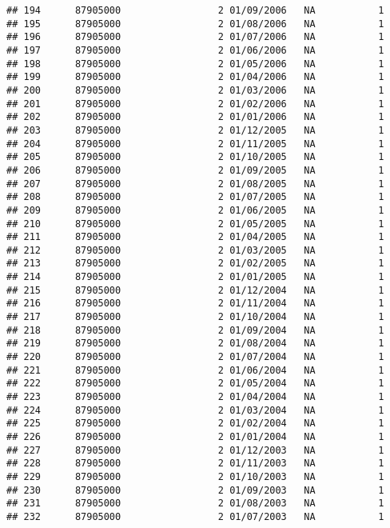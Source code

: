 \documentclass[
]{article}
\begin{document}
\begin{verbatim}
## 194      87905000                 2 01/09/2006   NA           1
## 195      87905000                 2 01/08/2006   NA           1
## 196      87905000                 2 01/07/2006   NA           1
## 197      87905000                 2 01/06/2006   NA           1
## 198      87905000                 2 01/05/2006   NA           1
## 199      87905000                 2 01/04/2006   NA           1
## 200      87905000                 2 01/03/2006   NA           1
## 201      87905000                 2 01/02/2006   NA           1
## 202      87905000                 2 01/01/2006   NA           1
## 203      87905000                 2 01/12/2005   NA           1
## 204      87905000                 2 01/11/2005   NA           1
## 205      87905000                 2 01/10/2005   NA           1
## 206      87905000                 2 01/09/2005   NA           1
## 207      87905000                 2 01/08/2005   NA           1
## 208      87905000                 2 01/07/2005   NA           1
## 209      87905000                 2 01/06/2005   NA           1
## 210      87905000                 2 01/05/2005   NA           1
## 211      87905000                 2 01/04/2005   NA           1
## 212      87905000                 2 01/03/2005   NA           1
## 213      87905000                 2 01/02/2005   NA           1
## 214      87905000                 2 01/01/2005   NA           1
## 215      87905000                 2 01/12/2004   NA           1
## 216      87905000                 2 01/11/2004   NA           1
## 217      87905000                 2 01/10/2004   NA           1
## 218      87905000                 2 01/09/2004   NA           1
## 219      87905000                 2 01/08/2004   NA           1
## 220      87905000                 2 01/07/2004   NA           1
## 221      87905000                 2 01/06/2004   NA           1
## 222      87905000                 2 01/05/2004   NA           1
## 223      87905000                 2 01/04/2004   NA           1
## 224      87905000                 2 01/03/2004   NA           1
## 225      87905000                 2 01/02/2004   NA           1
## 226      87905000                 2 01/01/2004   NA           1
## 227      87905000                 2 01/12/2003   NA           1
## 228      87905000                 2 01/11/2003   NA           1
## 229      87905000                 2 01/10/2003   NA           1
## 230      87905000                 2 01/09/2003   NA           1
## 231      87905000                 2 01/08/2003   NA           1
## 232      87905000                 2 01/07/2003   NA           1

\end{verbatim}
\end{document}
